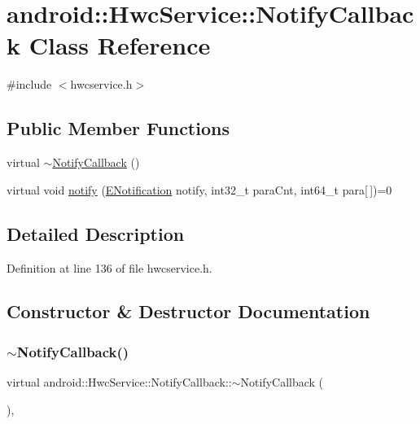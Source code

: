 \hypertarget{classandroid_1_1HwcService_1_1NotifyCallback}{}\section{android\+:\+:Hwc\+Service\+:\+:Notify\+Callback Class Reference}
\label{classandroid_1_1HwcService_1_1NotifyCallback}


{\ttfamily \#include $<$hwcservice.\+h$>$}

\subsection*{Public Member Functions}
\begin{DoxyCompactItemize}
\item 
virtual \mbox{\hyperlink{classandroid_1_1HwcService_1_1NotifyCallback_aa5cf72583ab5884844779792c0df2875}{$\sim$\+Notify\+Callback}} ()
\item 
virtual void \mbox{\hyperlink{classandroid_1_1HwcService_1_1NotifyCallback_af51d502801ff7b7bbcd9a2d6b840cdd5}{notify}} (\mbox{\hyperlink{classandroid_1_1HwcService_a34049a831dd1c85ef002e59be99d1bd8}{E\+Notification}} notify, int32\+\_\+t para\+Cnt, int64\+\_\+t para\mbox{[}$\,$\mbox{]})=0
\end{DoxyCompactItemize}


\subsection{Detailed Description}


Definition at line 136 of file hwcservice.\+h.



\subsection{Constructor \& Destructor Documentation}
\mbox{\label{classandroid_1_1HwcService_1_1NotifyCallback_aa5cf72583ab5884844779792c0df2875}} 
\subsubsection{\texorpdfstring{$\sim$\+Notify\+Callback()}{~NotifyCallback()}}
{\footnotesize\ttfamily virtual android\+::\+Hwc\+Service\+::\+Notify\+Callback\+::$\sim$\+Notify\+Callback (\begin{DoxyParamCaption}{ }\end{DoxyParamCaption})\hspace{0.3cm}{\ttfamily [inline]}, {\ttfamily [virtual]}}



